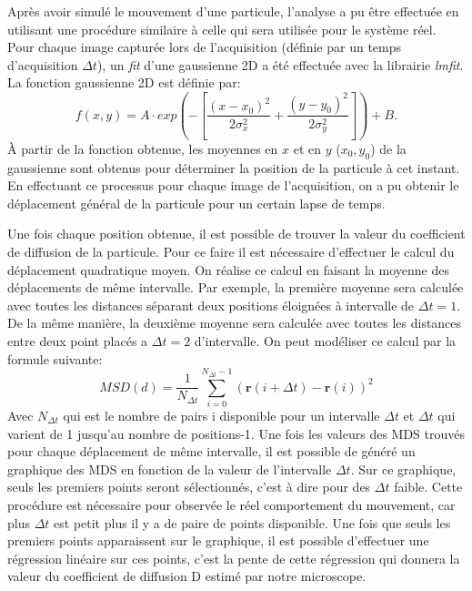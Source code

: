 \documentclass[conference]{IEEEtran}
\begin{document}
Après avoir simulé le mouvement d'une particule, l'analyse a pu être effectuée en utilisant une procédure similaire
à celle qui sera utilisée pour le système réel. Pour chaque image capturée lors de l'acquisition (définie par un temps d'acquisition $\Delta t$), un \textit{fit}
d'une gaussienne 2D a été effectuée avec la librairie \textit{lmfit}. La fonction gaussienne 2D est définie par:
\begin{equation}
  f(x,y)=A\cdot exp\left(-\left[\frac{(x-x_0)^2}{2\sigma_x^2}+\frac{(y-y_0)^2}{2\sigma_y^2}\right]\right)+B.
\end{equation}
À partir de la fonction obtenue, les moyennes en $x$ et en $y$ ($x_0,y_0$) de la gaussienne sont obtenus
pour déterminer la position de la particule à cet instant. En effectuant ce processus pour chaque image de l'acquisition,
on a pu obtenir le déplacement général de la particule pour un certain lapse de temps.


Une fois chaque position obtenue, il est possible de trouver la valeur du coefficient de diffusion de la particule. 
Pour ce faire il est nécessaire d'effectuer le calcul du déplacement quadratique moyen. On réalise ce calcul en faisant la moyenne des déplacements de même intervalle. Par exemple, 
la première moyenne sera calculée avec toutes les distances séparant deux positions éloignées à intervalle de $\Delta t=1$. De la même manière, la deuxième moyenne sera calculée avec toutes les distances
entre deux point placés a $\Delta t=2$ d'intervalle. On peut modéliser ce calcul par la formule suivante: 
\begin{equation}
  MSD(d) = \frac{1}{N_{\Delta t}} \sum_{i=0}^{N_{\Delta t} - 1} \left( \mathbf{r}(i+\Delta t) - \mathbf{r}(i) \right)^2
\end{equation}
Avec $N_{\Delta t}$ qui est le nombre de pairs i disponible pour un intervalle $\Delta t$ et $\Delta t$ qui varient de 1 jusqu'au nombre de positions-1. 
Une fois les valeurs des MDS trouvés pour chaque déplacement de même intervalle, il est possible de généré un graphique 
des MDS en fonction de la valeur de l'intervalle $\Delta t$. Sur ce graphique, seuls les premiers points seront sélectionnés, c'est à dire pour des $\Delta t$ faible.
Cette procédure est nécessaire pour observée le réel comportement du mouvement, car plus $\Delta t$ est petit plus il y a de paire de points disponible. 
Une fois que seuls les premiers points apparaissent sur le graphique, il est possible d'effectuer une régression linéaire sur
ces points, c'est la pente de cette régression qui donnera la valeur du coefficient de diffusion D estimé par notre microscope. 
\end{document}
